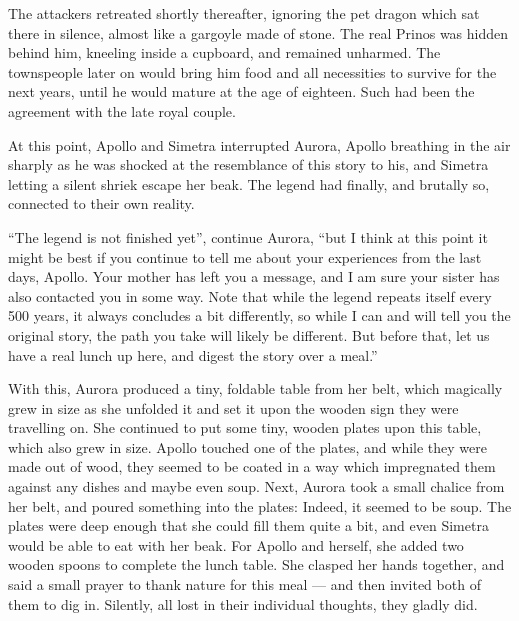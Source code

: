The attackers retreated shortly thereafter, ignoring the pet dragon which sat there in silence, almost like a gargoyle made of stone. The real Prinos was hidden behind him, kneeling inside a cupboard, and remained unharmed. The townspeople later on would bring him food and all necessities to survive for the next years, until he would mature at the age of eighteen. Such had been the agreement with the late royal couple.

\froufrou{}

At this point, Apollo and Simetra interrupted Aurora, Apollo breathing in the air sharply as he was shocked at the resemblance of this story to his, and Simetra letting a silent shriek escape her beak. The legend had finally, and brutally so, connected to their own reality.

\enquote{The legend is not finished yet}, continue Aurora, \enquote{but I think at this point it might be best if you continue to tell me about your experiences from the last days, Apollo. Your mother has left you a message, and I am sure your sister has also contacted you in some way. Note that while the legend repeats itself every 500 years, it always concludes a bit differently, so while I can and will tell you the original story, the path you take will likely be different. But before that, let us have a real lunch up here, and digest the story over a meal.}

With this, Aurora produced a tiny, foldable table from her belt, which magically grew in size as she unfolded it and set it upon the wooden sign they were travelling on. She continued to put some tiny, wooden plates upon this table, which also grew in size. Apollo touched one of the plates, and while they were made out of wood, they seemed to be coated in a way which impregnated them against any dishes and maybe even soup. Next, Aurora took a small chalice from her belt, and poured something into the plates: Indeed, it seemed to be soup. The plates were deep enough that she could fill them quite a bit, and even Simetra would be able to eat with her beak. For Apollo and herself, she added two wooden spoons to complete the lunch table. She clasped her hands together, and said a small prayer to thank nature for this meal --- and then invited both of them to dig in. Silently, all lost in their individual thoughts, they gladly did.
